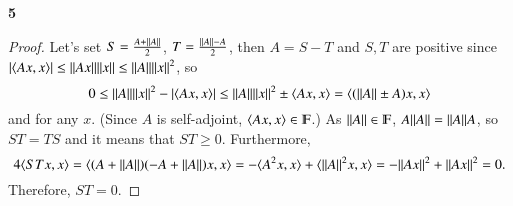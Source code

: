 \documentclass[a4paper, 12pt]{article}
\theoremstyle{Mydefinition}
\theoremstyle{Mytheorem}
\begin{document}
\noindent \textbf{5}
\begin{proof}
Let's set $S = \frac{A+\norm{A}}{2}$, $T = \frac{\norm{A}-A}{2}$, then $A = S-T$ and $S,T$ are positive since $\abs{\langle Ax, x\rangle} \leq \norm{Ax}\norm{x}\leq \norm{A}\norm{x}^2$, so
\begin{equation}
    0\leq \norm{A}\norm{x}^2 - \abs{\langle Ax, x\rangle} \leq\norm{A}\norm{x}^2 \pm \langle Ax, x\rangle=\langle (\norm{A}\pm A)x, x\rangle
\end{equation}
and for any $x$. (Since $A$ is self-adjoint, $\langle Ax, x\rangle \in \varmathbb{F}$.) As $\norm{A}\in\varmathbb{F}$, $A\norm{A} = \norm{A}A$, so $ST=TS$ and it means that $ST\geq 0$. Furthermore,
\begin{equation}
    4\langle STx, x\rangle = \langle (A+\norm{A})(-A+\norm{A})x, x\rangle = -\langle A^2 x, x\rangle + \langle \norm{A}^2 x, x\rangle = -\norm{Ax}^2+\norm{Ax}^2 = 0.
\end{equation}
Therefore, $ST = 0$. 
\end{proof}
\end{document}
